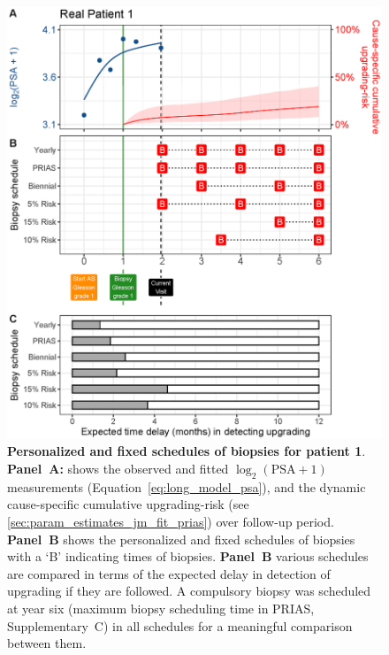 \begin{figure}
\centerline{\includegraphics[width=\columnwidth]{images/demo_pat1_supp.eps}}
\caption{\textbf{Personalized and fixed schedules of biopsies for patient 1}. \textbf{Panel~A:} shows the observed and fitted $\log_2(\mbox{PSA} + 1)$ measurements (Equation~\ref{eq:long_model_psa}), and the dynamic cause-specific cumulative upgrading-risk (see \ref{sec:param_estimates_jm_fit_prias}) over follow-up period. \textbf{Panel~B} shows the personalized and fixed schedules of biopsies with a `B' indicating times of biopsies. \textbf{Panel~B} various schedules are compared in terms of the expected delay in detection of upgrading if they are followed. A compulsory biopsy was scheduled at year six (maximum biopsy scheduling time in PRIAS, Supplementary~C) in all schedules for a meaningful comparison between them.}
\label{fig:demo_pat1_supp}
\end{figure}

